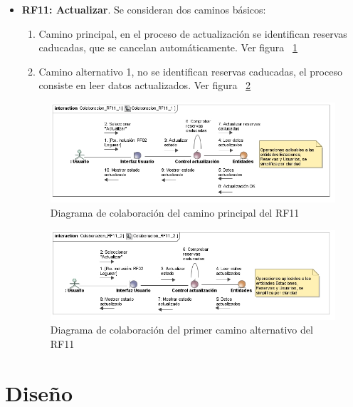 \begin{itemize}
	\FloatBarrier
	\item \textbf{RF11: Actualizar}. Se consideran dos caminos básicos: 
	\begin{enumerate}
		\item Camino principal, en el proceso de actualización se identifican reservas caducadas, que se cancelan automáticamente. Ver figura ~\ref{fig:diagramaColaboracion_RF11_1}
		\item Camino alternativo 1, no se identifican reservas caducadas, el proceso consiste en leer datos actualizados. Ver figura ~\ref{fig:diagramaColaboracion_RF11_2}
	\end{enumerate}
	\begin{figure} [!htb]
		\centering
		\includegraphics[width=\linewidth,height=\textheight,keepaspectratio]{Images/Diagramas/04_Colaboracion_RF11_1}
		\caption{Diagrama de colaboración del camino principal del RF11}
		\label{fig:diagramaColaboracion_RF11_1}
	\end{figure}
	\begin{figure} [!htb]
		\centering
		\includegraphics[width=\linewidth,height=\textheight,keepaspectratio]{Images/Diagramas/04_Colaboracion_RF11_2}
		\caption{Diagrama de colaboración del primer camino alternativo del RF11}
		\label{fig:diagramaColaboracion_RF11_2}
	\end{figure}
		
\end{itemize}



\section{Diseño}


